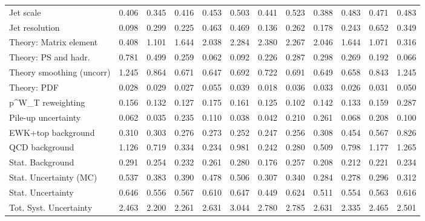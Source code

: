 \begin{tabular}{l|p{0.6cm}p{0.6cm}p{0.6cm}p{0.6cm}p{0.6cm}p{0.6cm}p{0.6cm}p{0.6cm}p{0.6cm}p{0.6cm}p{0.6cm}}
Jet scale                                & 0.406 & 0.345 & 0.416 & 0.453 & 0.503 & 0.441 & 0.523 & 0.388 & 0.483 & 0.471 & 0.483 \\
Jet resolution                           & 0.098 & 0.299 & 0.225 & 0.463 & 0.469 & 0.136 & 0.262 & 0.178 & 0.243 & 0.652 & 0.349 \\
Theory: Matrix element                   & 0.408 & 1.101 & 1.644 & 2.038 & 2.284 & 2.380 & 2.267 & 2.046 & 1.644 & 1.071 & 0.316 \\
Theory: PS and hadr.                     & 0.781 & 0.499 & 0.259 & 0.062 & 0.092 & 0.226 & 0.287 & 0.298 & 0.269 & 0.192 & 0.066 \\
Theory smoothing (uncorr)                & 1.245 & 0.864 & 0.671 & 0.647 & 0.692 & 0.722 & 0.691 & 0.649 & 0.658 & 0.843 & 1.245 \\
Theory: PDF                              & 0.028 & 0.029 & 0.027 & 0.055 & 0.039 & 0.018 & 0.036 & 0.033 & 0.026 & 0.031 & 0.050 \\
p^{W}_{T} reweighting                    & 0.156 & 0.132 & 0.127 & 0.175 & 0.161 & 0.125 & 0.102 & 0.142 & 0.133 & 0.159 & 0.287 \\
Pile-up uncertainty                      & 0.062 & 0.035 & 0.235 & 0.110 & 0.038 & 0.042 & 0.210 & 0.261 & 0.068 & 0.208 & 0.100 \\
EWK+top background                       & 0.310 & 0.303 & 0.276 & 0.273 & 0.252 & 0.247 & 0.256 & 0.308 & 0.454 & 0.567 & 0.826 \\
QCD background                           & 1.126 & 0.719 & 0.334 & 0.234 & 0.981 & 0.242 & 0.280 & 0.509 & 0.798 & 1.177 & 1.265 \\
Stat. Background                         & 0.291 & 0.254 & 0.232 & 0.261 & 0.280 & 0.176 & 0.257 & 0.208 & 0.212 & 0.221 & 0.234 \\
Stat. Uncertainty (MC)                   & 0.537 & 0.383 & 0.390 & 0.478 & 0.506 & 0.307 & 0.340 & 0.284 & 0.278 & 0.296 & 0.312 \\
\hline
Stat. Uncertainty                        & 0.646 & 0.556 & 0.567 & 0.610 & 0.647 & 0.449 & 0.624 & 0.511 & 0.554 & 0.563 & 0.616 \\
\hline
Tot. Syst. Uncertainty                   & 2.463 & 2.200 & 2.261 & 2.631 & 3.044 & 2.780 & 2.785 & 2.631 & 2.335 & 2.465 & 2.501 \\
\hline
\end{tabular}
